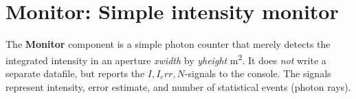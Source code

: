 \section{Monitor: Simple intensity monitor}

The \textbf{Monitor} component is a simple photon counter that merely detects the integrated
intensity in an aperture \textit{xwidth} by \textit{yheight} \si{m^2}. It does \emph{not} write 
a separate datafile, but reports the $I, I_err, N$-signals to the console. The signals represent
 intensity, error estimate, and number of statistical events (photon rays). 
